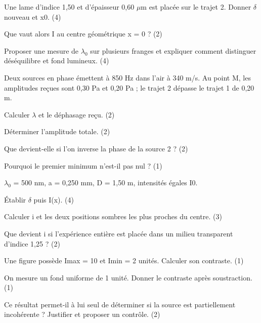 \begin{questions}
\item Une lame d’indice 1,50 et d’épaisseur 0,60 \ensuremath{\mu}m est placée sur le trajet 2. Donner \ensuremath{\delta} nouveau et x0. (4)
\item Que vaut alors I au centre géométrique x = 0 ? (2)
\end{questions}

\begin{questions}
\item Proposer une mesure de \ensuremath{\lambda_0} sur plusieurs franges et expliquer comment distinguer déséquilibre et fond lumineux. (4)
\end{questions}



Deux sources en phase émettent à 850 Hz dans l’air à 340 m/s. Au point M, les amplitudes reçues sont 0,30 Pa et 0,20 Pa ; le trajet 2 dépasse le trajet 1 de 0,20 m.\begin{questions}
\item Calculer \ensuremath{\lambda} et le déphasage reçu. (2)
\item Déterminer l’amplitude totale. (2)
\item Que devient-elle si l’on inverse la phase de la source 2 ? (2)
\item Pourquoi le premier minimum n’est-il pas nul ? (1)
\end{questions}

\ensuremath{\lambda_0} = 500 nm, a = 0,250 mm, D = 1,50 m, intensités égales I0.\begin{questions}
\item Établir \ensuremath{\delta} puis I(x). (4)
\item Calculer i et les deux positions sombres les plus proches du centre. (3)
\item Que devient i si l’expérience entière est placée dans un milieu transparent d’indice 1,25 ? (2)
\end{questions}



\begin{questions}
\item Une figure possède Imax = 10 et Imin = 2 unités. Calculer son contraste. (1)
\item On mesure un fond uniforme de 1 unité. Donner le contraste après soustraction. (1)
\item Ce résultat permet-il à lui seul de déterminer si la source est partiellement incohérente ? Justifier et proposer un contrôle. (2)
\end{questions}

